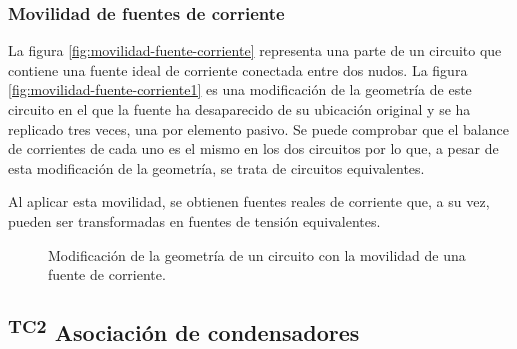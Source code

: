 \subsubsection{Movilidad de fuentes de corriente}
\label{sec:movilidad-fuentes-corriente}

La figura \ref{fig:movilidad-fuente-corriente} representa una parte de
un circuito que contiene una fuente ideal de corriente conectada entre
dos nudos. La figura \ref{fig:movilidad-fuente-corriente1} es una
modificación de la geometría de este circuito en el que la fuente ha
desaparecido de su ubicación original y se ha replicado tres veces,
una por elemento pasivo. Se puede comprobar que el balance de
corrientes de cada uno es el mismo en los dos circuitos por lo que, a
pesar de esta modificación de la geometría, se trata de circuitos
equivalentes.

Al aplicar esta movilidad, se obtienen fuentes reales de corriente
que, a su vez, pueden ser transformadas en fuentes de tensión
equivalentes.

\begin{figure}[H]
  \centering {}\hspace{{4cm}}
  \caption{Modificación de la geometría de un circuito con la
    movilidad de una fuente de corriente.}
\end{figure}

\subsection{\textsuperscript{TC2} Asociación de condensadores}
\label{sec:carga-aislada}

